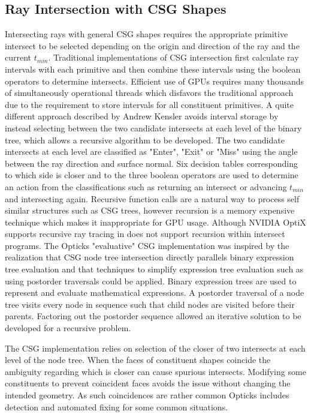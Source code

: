 \documentclass{webofc}
\begin{document}
\subsection{Ray Intersection with CSG Shapes}
\label{intersection}
%
Intersecting rays with general CSG shapes requires the appropriate primitive intersect to be 
selected depending on the origin and direction of the ray and the current $t_{min}$. Traditional implementations of CSG intersection first calculate 
ray intervals with each primitive and then combine these intervals using the boolean operators to determine intersects.  
Efficient use of GPUs requires many thousands of simultaneously operational threads which disfavors the traditional approach due to 
the requirement to store intervals for all constituent primitives.  A quite different approach
described by Andrew Kensler\cite{kensler} avoids interval storage by instead selecting between 
the two candidate intersects at each level of the binary tree, which allows a recursive algorithm 
to be developed. The two candidate intersects at each level are classified as "Enter", "Exit" or "Miss" 
using the angle between the ray direction and surface normal. Six decision tables corresponding to which side is closer and 
to the three boolean operators are used to determine an action from the classifications such as returning an intersect 
or advancing $t_{min}$ and intersecting again. 
Recursive function calls are a natural way to process self similar structures such as CSG trees,  
however recursion is a memory expensive technique which makes it inappropriate for GPU usage.
Although NVIDIA OptiX supports recursive ray tracing in does not support recursion within intersect programs. 
The Opticks "evaluative" CSG implementation was inspired by the realization that CSG node tree intersection 
directly parallels binary expression tree evaluation and that techniques to simplify expression 
tree evaluation such as using postorder traversals could be applied. 
Binary expression trees are used to represent and evaluate mathematical expressions. 
A postorder traversal of a node tree visits every node in sequence such that
child nodes are visited before their parents.
Factoring out the postorder sequence allowed an iterative solution to be developed 
for a recursive problem.  

The CSG implementation relies on selection of the closer of two intersects at each level 
of the node tree. When the faces of constituent shapes coincide the ambiguity regarding which is closer
can cause spurious intersects. Modifying some constituents to prevent coincident faces avoids 
the issue without changing the intended geometry. As such coincidences are rather common Opticks includes 
detection and automated fixing for some common situations.        
%
\end{document}
